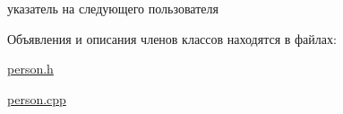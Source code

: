 указатель на следующего пользователя 



Объявления и описания членов классов находятся в файлах\-:\begin{DoxyCompactItemize}
\item 
\hyperlink{person_8h}{person.\-h}\item 
\hyperlink{person_8cpp}{person.\-cpp}\end{DoxyCompactItemize}
